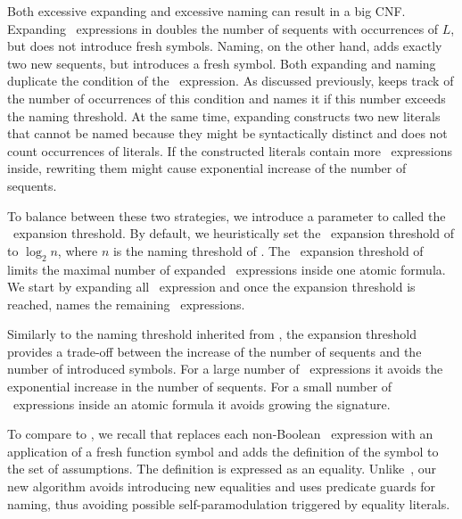 Both excessive expanding and excessive naming can result in a big CNF. Expanding \ITE\ expressions in \nfcnf{} doubles the number of sequents with occurrences of $L$, but does not introduce fresh symbols. Naming, on the other hand, adds exactly two new sequents, but introduces a fresh symbol. Both expanding and naming duplicate the condition of the \ITE\ expression. As discussed previously, \nfcnf{} keeps track of the number of occurrences of this condition and names it if this number exceeds the naming threshold. At the same time, expanding constructs two new literals that cannot be named because they might be syntactically distinct and \nfcnf{} does not count occurrences of literals. If the constructed literals contain more \ITE\ expressions inside, rewriting them might cause exponential increase of the number of sequents.

To balance between these two strategies, we introduce a parameter to \nfcnf{} called the \ITE\ expansion threshold.
By default, we heuristically set the \ITE\ expansion threshold of \nfcnf{} to $\log_2 n$, where $n$ is the naming threshold of \newcnf{}. The \ITE\ expansion threshold of \nfcnf{} limits the maximal number of expanded \ITE\ expressions inside one atomic formula. We start by expanding all \ITE\ expression and once the expansion threshold is reached, \nfcnf{} names the remaining \ITE\ expressions.

Similarly to the naming threshold inherited from \newcnf{},
the expansion threshold 
provides a trade-off between the increase of the number of sequents and the number of introduced symbols. For a large number of \ITE\ expressions it avoids the exponential increase in the number of sequents. For a small number of \ITE\ expressions inside an atomic formula it avoids growing the signature.


To compare to \oldcnf{}, we recall that \oldcnf{} replaces each non-Boolean \ITE\ expression with an application of a fresh function symbol and adds the definition of the symbol to the set of assumptions. The definition is expressed as an equality. 
Unlike~\oldcnf{}, our new \nfcnf{} algorithm avoids introducing new equalities and uses predicate guards for naming, thus avoiding possible self-paramodulation triggered by equality literals. %


